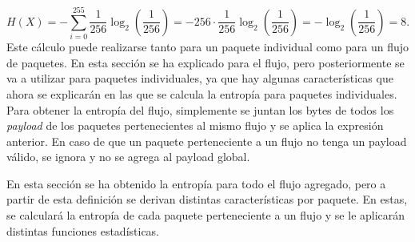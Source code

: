 \begin{equation}{}
H(X)
= - \sum_{i=0}^{255} \frac{1}{256}\log_2\left(\frac{1}{256}\right)
= -256 \cdot \frac{1}{256}\log_2\left(\frac{1}{256}\right)
= -\log_2\left(\frac{1}{256}\right)
= 8.
\end{equation}Este cálculo puede realizarse tanto para un paquete individual como para un flujo de paquetes. En esta sección se ha explicado para el flujo, pero posteriormente se va a utilizar para paquetes individuales, ya que hay algunas características que ahora se explicarán en las que se calcula la entropía para paquetes individuales. Para obtener la entropía del flujo, simplemente se juntan los bytes de todos los \textit{payload} de los paquetes pertenecientes al mismo flujo y se aplica la expresión anterior. En caso de que un paquete perteneciente a un flujo no tenga un payload válido, se ignora y no se agrega al payload global.

En esta sección se ha obtenido la entropía para todo el flujo agregado, pero a partir de esta definición se derivan distintas características por paquete. En estas, se calculará la entropía de cada paquete perteneciente a un flujo y se le aplicarán distintas funciones estadísticas.